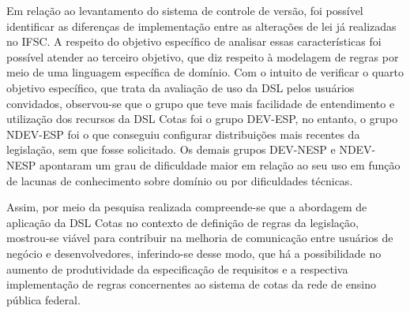 Em relação ao levantamento do sistema de controle de versão, foi possível identificar as diferenças de implementação entre as alterações de lei já realizadas no \gls{IFSC}. A respeito do objetivo específico de analisar essas características foi possível atender ao terceiro objetivo, que diz respeito à modelagem de regras por meio de uma linguagem específica de domínio. Com o intuito de verificar o quarto objetivo específico, que trata da avaliação de uso da DSL pelos usuários convidados, observou-se que o grupo que teve mais facilidade de entendimento e utilização dos recursos da DSL Cotas foi o grupo DEV-ESP, no entanto, o grupo NDEV-ESP foi o que conseguiu configurar distribuições mais recentes da legislação, sem que fosse solicitado. Os demais grupos DEV-NESP e NDEV-NESP apontaram um grau de dificuldade maior em relação ao seu uso em função de lacunas de conhecimento sobre domínio ou por dificuldades técnicas.

Assim, por meio da pesquisa realizada compreende-se que a abordagem de aplicação da DSL Cotas no contexto de definição de regras da legislação, mostrou-se viável para contribuir na melhoria de comunicação entre usuários de negócio e desenvolvedores, inferindo-se desse modo, que há a possibilidade no aumento de produtividade da especificação de requisitos e a respectiva implementação de regras concernentes ao sistema de cotas da rede de ensino pública federal.


